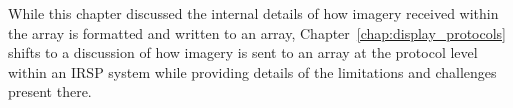     While this chapter discussed the internal details of how imagery received within the array is formatted and written to an array, Chapter~\ref{chap:display_protocols} shifts to a discussion of how imagery is sent to an array at the protocol level within an IRSP system while providing details of the limitations and challenges present there.
